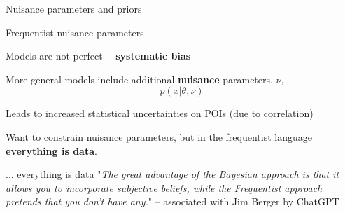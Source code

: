 \documentclass[
aspectratio=169,
14pt,
professionalfonts
]{beamer}
\newcommand{\arrow}{~\ding{220}~}
\begin{document}
\begin{frame}
\center
\Large
Nuisance parameters and priors
\end{frame}

\begin{frame}{Frequentist nuisance parameters}

Models are not perfect \arrow \textbf{systematic bias}

More general models include additional \textbf{nuisance} parameters, $\nu$,
$$p(x|\theta, \nu)$$

Leads to increased statistical uncertainties on POIs (due to correlation)

Want to constrain nuisance parameters, but in the frequentist language \textbf{everything is data}.








\end{frame}

\begin{frame}{... everything is data}
    "\textit{The great advantage of the Bayesian approach is that it allows you to incorporate subjective beliefs, while the Frequentist approach pretends that you don't have any.}"
    \flushright -- associated with Jim Berger by ChatGPT
\end{frame}
\end{document}

